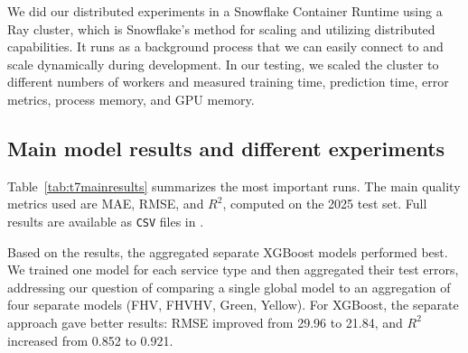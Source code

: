 \documentclass[fleqn,moreauthors,9pt]{ds_report}
\begin{document}
We did our distributed experiments in a Snowflake Container Runtime using a Ray cluster, which is Snowflake's method for scaling and utilizing distributed capabilities. It runs as a background process that we can easily connect to and scale dynamically during development. In our testing, we scaled the cluster to different numbers of workers and measured training time, prediction time, error metrics, process memory, and GPU memory.

\subsection*{Main model results and different experiments}

Table~\ref{tab:t7mainresults} summarizes the most important runs. The main quality metrics used are MAE, RMSE, and $R^2$, computed on the 2025 test set. Full results are available as \texttt{CSV} files in .

\begin{table}[h]
\centering
\caption{Main T7 model results on the 2025 test set.}
\label{tab:t7mainresults}
\scriptsize
{}
\end{table}

Based on the results, the aggregated separate XGBoost models performed best. We trained one model for each service type and then aggregated their test errors, addressing our question of comparing a single global model to an aggregation of four separate models (FHV, FHVHV, Green, Yellow). For XGBoost, the separate approach gave better results: RMSE improved from 29.96 to 21.84, and $R^2$ increased from 0.852 to 0.921.
\end{document}
